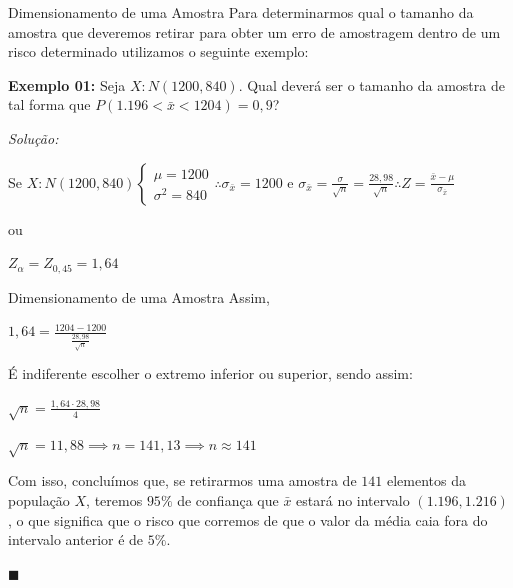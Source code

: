 \documentclass[hyperref={pdfpagelabels=false}]{beamer}
\begin{document}
\begin{frame}{Dimensionamento de uma Amostra}
	Para determinarmos qual o tamanho da amostra que deveremos retirar para obter um erro de amostragem dentro de um risco determinado utilizamos o seguinte exemplo:
	
	\pause
	{\bf Exemplo 01:} Seja $X:N(1200,840)$. Qual deverá ser o tamanho da amostra de tal forma que $P(1.196 < \bar{x} <1204) = 0,9$?
	
	\pause
	{\it Solução:}
	
	Se $X:N(1200,840) \begin{cases}
	\mu = 1200 \\
	\sigma^2 = 840
	\end{cases}
	\therefore \sigma_{\bar{x}} = 1200
	$
	\pause
	e
	\pause
	$\sigma_{\bar{x}} = \displaystyle \frac{\sigma}{\sqrt{n}} = \frac{28,98}{\sqrt{n}} \therefore Z = \frac{\bar{x} - \mu}{\sigma_{\bar{x}}}$
	
	ou
	
	$Z_{\alpha} = Z_{0,45} = 1,64$
	
\end{frame}

\begin{frame}{Dimensionamento de uma Amostra}
	Assim,
	
	\pause
	$1,64 = \displaystyle \frac{1204 - 1200}{\frac{28,98}{\sqrt{n}}}$
	
	\pause
	É indiferente escolher o extremo inferior ou superior, sendo assim:
	
	$\displaystyle \sqrt{n} = \frac{1,64 \cdot 28,98}{4}$
	
	$\displaystyle \sqrt{n} = 11,88 \implies n = 141,13 \implies n \approx 141$
	
	\pause
	Com isso, concluímos que, se retirarmos uma amostra de $141$ elementos da população $X$, teremos $95\%$ de confiança que $\bar{x}$ estará no intervalo $(1.196,1.216)$, o que significa que o risco que corremos de que o valor da média caia fora do intervalo anterior é de $5\%$.
	\begin{flushright}
		$\blacksquare$
	\end{flushright}
\end{frame}
\end{document}
